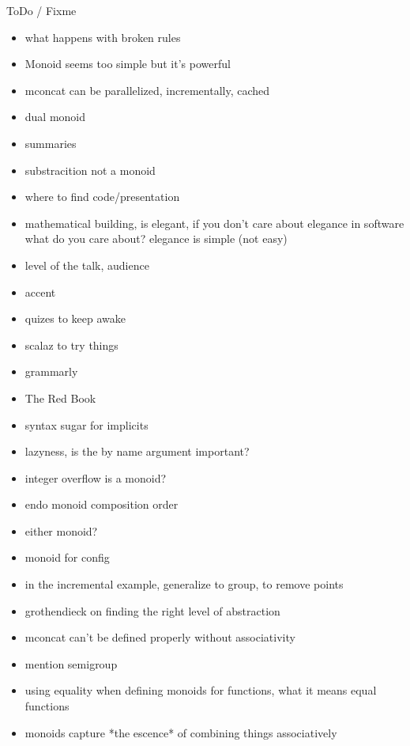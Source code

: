 \documentclass{beamer}
\begin{document}
\begin{frame}{ToDo / Fixme}
  \begin{itemize}
    \item what happens with broken rules
    \item Monoid seems too simple but it's powerful
    \item mconcat can be parallelized, incrementally, cached
    \item dual monoid
    \item summaries
    \item substracition not a monoid
    \item where to find code/presentation
    \item mathematical building, is elegant, if you don't care about
          elegance in software what do you care about? elegance is simple (not easy)
    \item level of the talk, audience
    \item accent
    \item quizes to keep awake
    \item scalaz to try things
    \item grammarly
    \item The Red Book
    \item syntax sugar for implicits
    \item lazyness, is the by name argument important?
    \item integer overflow is a monoid?
    \item endo monoid composition order
    \item either monoid?
    \item monoid for config
    \item in the incremental example, generalize to group, to remove points
    \item grothendieck on finding the right level of abstraction
    \item mconcat can't be defined properly without associativity
      \item mention semigroup
        \item using equality when defining monoids for functions, what it means
          equal functions
          \item monoids capture *the escence* of combining things associatively
  \end{itemize}
\end{frame}
\end{document}
